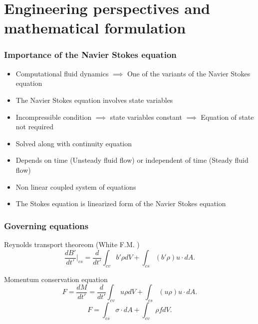 \documentclass{beamer}
\begin{document}
\section{Engineering perspectives and mathematical formulation} %
\begin{frame}
\frametitle{Importance of the Navier Stokes equation}
\begin{itemize}

\item Computational fluid dynamics $\implies$ One of the variants of the Navier Stokes equation
\item The Navier Stokes equation involves state variables
\item Incompressible condition $\implies$ state variables constant $\implies$ Equation of state not required
\item Solved along with continuity equation
\item Depends on time (Unsteady fluid flow) or independent of time (Steady fluid flow)
\item Non linear coupled system of equations
\item The Stokes equation is linearized form of the Navier Stokes equation

\end{itemize}

\end{frame}


\begin{frame}
\frametitle{Governing equations}

\begin{block}{Reynolds transport theoreom (White F.M. \cite{white})} 
\begin{equation} \label{rtt} 
\frac{dB'}{dt'}|_{cs} = \frac{d}{dt'} \int_{cv} b' \rho dV + \int_{cs} (b' \rho) u\cdot dA \textrm{.}
\end{equation}
\end{block}

\begin{block}{Momentum conservation equation}
\begin{equation}\label{External force lhs}
F = \frac{dM}{dt'} = \frac{d}{dt'} \int_{cv} u \rho dV + \int_{cs} (u \rho) u\cdot dA \textrm{.}
\end{equation}
\begin{equation}\label{External force rhs}
F = \int_{cs} \sigma \cdot dA + \int_{cv} \rho f dV \textrm{.}
\end{equation}
\end{block}

\end{frame}
\end{document}
